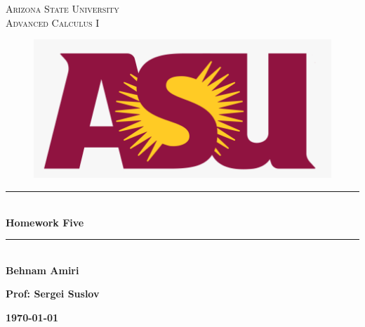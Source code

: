 \documentclass[fleqn]{article}
\begin{document}
  \begin{titlepage}

    \newcommand{\HRule}{\rule{\linewidth}{0.5mm}}

    \center


    \textsc{\LARGE Arizona State University}\\[1.5cm]

    \textsc{\LARGE Advanced Calculus I }\\[1.5cm]


    \begin{figure}
      \includegraphics[width=\linewidth]{asu.png}
    \end{figure}


    \HRule \\[0.4cm]
    { \huge \bfseries Homework Five }\\[0.4cm] 
    \HRule \\[1.5cm]

    \textbf{Behnam Amiri}

    \bigbreak

    \textbf{Prof: Sergei Suslov}

    \bigbreak


    \textbf{{\large \today}\\[2cm]}

    \vfill

  \end{titlepage}
\end{document}
